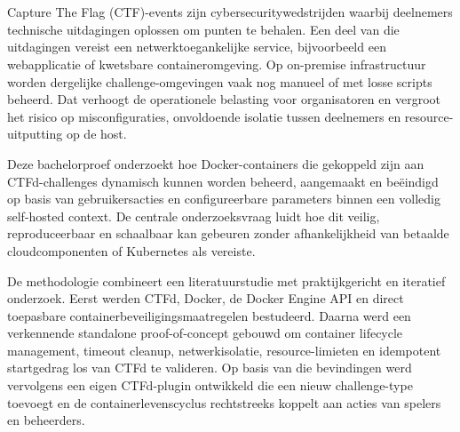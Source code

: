 
%


\chapter*{}

Capture The Flag (CTF)-events zijn cybersecuritywedstrijden waarbij deelnemers technische uitdagingen oplossen om punten te behalen. Een deel van die uitdagingen vereist een netwerktoegankelijke service, bijvoorbeeld een webapplicatie of kwetsbare containeromgeving. Op on-premise infrastructuur worden dergelijke challenge-omgevingen vaak nog manueel of met losse scripts beheerd. Dat verhoogt de operationele belasting voor organisatoren en vergroot het risico op misconfiguraties, onvoldoende isolatie tussen deelnemers en resource-uitputting op de host.

Deze bachelorproef onderzoekt hoe Docker-containers die gekoppeld zijn aan CTFd-challenges dynamisch kunnen worden beheerd, aangemaakt en beëindigd op basis van gebruikersacties en configureerbare parameters binnen een volledig self-hosted context. De centrale onderzoeksvraag luidt hoe dit veilig, reproduceerbaar en schaalbaar kan gebeuren zonder afhankelijkheid van betaalde cloudcomponenten of Kubernetes als vereiste.

De methodologie combineert een literatuurstudie met praktijkgericht en iteratief onderzoek. Eerst werden CTFd, Docker, de Docker Engine API en direct toepasbare containerbeveiligingsmaatregelen bestudeerd. Daarna werd een verkennende standalone proof-of-concept gebouwd om container lifecycle management, timeout cleanup, netwerkisolatie, resource-limieten en idempotent startgedrag los van CTFd te valideren. Op basis van die bevindingen werd vervolgens een eigen CTFd-plugin ontwikkeld die een nieuw challenge-type toevoegt en de containerlevenscyclus rechtstreeks koppelt aan acties van spelers en beheerders.

